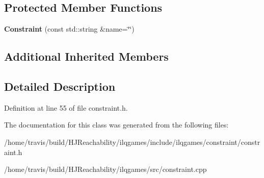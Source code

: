 \subsection*{Protected Member Functions}
\begin{DoxyCompactItemize}
\item 
{\bfseries Constraint} (const std\+::string \&name=\char`\"{}\char`\"{})\hypertarget{classilqgames_1_1_constraint_a845ad9283a9921452afa22c34404302c}{}\label{classilqgames_1_1_constraint_a845ad9283a9921452afa22c34404302c}

\end{DoxyCompactItemize}
\subsection*{Additional Inherited Members}


\subsection{Detailed Description}


Definition at line 55 of file constraint.\+h.



The documentation for this class was generated from the following files\+:\begin{DoxyCompactItemize}
\item 
/home/travis/build/\+H\+J\+Reachability/ilqgames/include/ilqgames/constraint/constraint.\+h\item 
/home/travis/build/\+H\+J\+Reachability/ilqgames/src/constraint.\+cpp\end{DoxyCompactItemize}
